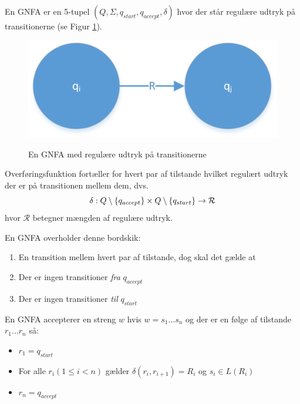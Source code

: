\documentclass[a4paper,10pt,article]{memoir}
\begin{document}
\begin{definition}
En GNFA er en 5-tupel $(Q, \Sigma, q_{start}, q_{accept}, \delta)$ hvor der står regulære udtryk på transitionerne (se Figur \ref{fig:fig16}).
\end{definition}
\begin{figure}[H]%
{\centering 
\includegraphics[width=\textwidth]{Fig16x.png}
} \caption{En GNFA med regulære udtryk på transitionerne}
\label{fig:fig16}
\end{figure}

Overføringsfunktion fortæller for hvert par af tilstande hvilket
regulært udtryk der er på transitionen mellem dem, dvs.
%
\[ \delta: Q\setminus\{q_{accept}\}\times Q\setminus\{q_{start}\} \rightarrow
\mathcal{R} \]
%
hvor $\mathcal{R}$ betegner mængden af regulære udtryk.

En GNFA overholder denne bordskik:
\begin{enumerate}
\item En transition mellem hvert par af tilstande, dog skal det gælde
  at
\item Der er ingen transitioner \emph{fra} $q_{accept}$
\item Der er ingen transitioner \emph{til} $q_{start}$
\end{enumerate}
%
En GNFA accepterer en streng $w$ hvis $w = s_1 \ldots s_n$ og der er en
følge af tilstande $r_1 \ldots r_n$ så:
\begin{itemize}
\item $r_1 = q_{start}$
\item For alle $r_i (1 \leq i < n)$ gælder $\delta (r_i, r_{i+1})=R_i$ og $s_i \in L(R_i)$
\item $r_n = q_{accept}$
\end{itemize}
\end{document}
